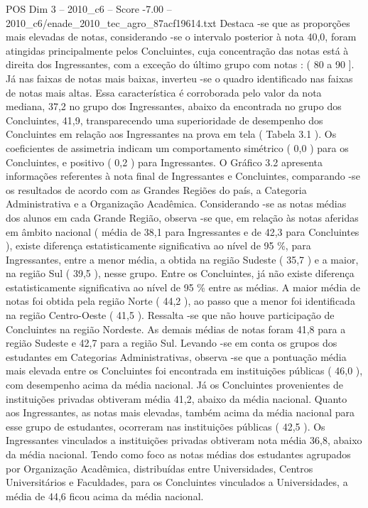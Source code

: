 \begin{textsample}{POS Dim 3 – 2010\_c6 – Score -7.00 – 2010\_c6/enade\_2010\_tec\_agro\_87acf19614.txt}
Destaca -se que as proporções mais elevadas de notas, considerando -se o intervalo posterior à nota 40,0, foram atingidas principalmente pelos Concluintes, cuja concentração das notas está à direita dos Ingressantes, com a exceção do último grupo com notas : ( 80 a 90 ].
Já nas faixas de notas mais baixas, inverteu -se o quadro identificado nas faixas de notas mais altas.
Essa característica é corroborada pelo valor da nota mediana, 37,2 no grupo dos Ingressantes, abaixo da encontrada no grupo dos Concluintes, 41,9, transparecendo uma superioridade de desempenho dos Concluintes em relação aos Ingressantes na prova em tela ( Tabela 3.1 ).
Os coeficientes de assimetria indicam um comportamento simétrico ( 0,0 ) para os Concluintes, e positivo ( 0,2 ) para Ingressantes.
O Gráfico 3.2 apresenta informações referentes à nota final de Ingressantes e Concluintes, comparando -se os resultados de acordo com as Grandes Regiões do país, a Categoria Administrativa e a Organização Acadêmica.
Considerando -se as notas médias dos alunos em cada Grande Região, observa -se que, em relação às notas aferidas em âmbito nacional ( média de 38,1 para Ingressantes e de 42,3 para Concluintes ), existe diferença estatisticamente significativa ao nível de 95 \%, para Ingressantes, entre a menor média, a obtida na região Sudeste ( 35,7 ) e a maior, na região Sul ( 39,5 ), nesse grupo.
Entre os Concluintes, já não existe diferença estatisticamente significativa ao nível de 95 \% entre as médias.
A maior média de notas foi obtida pela região Norte ( 44,2 ), ao passo que a menor foi identificada na região Centro-Oeste ( 41,5 ).
Ressalta -se que não houve participação de Concluintes na região Nordeste.
As demais médias de notas foram 41,8 para a região Sudeste e 42,7 para a região Sul.
Levando -se em conta os grupos dos estudantes em Categorias Administrativas, observa -se que a pontuação média mais elevada entre os Concluintes foi encontrada em instituições públicas ( 46,0 ), com desempenho acima da média nacional.
Já os Concluintes provenientes de instituições privadas obtiveram média 41,2, abaixo da média nacional.
Quanto aos Ingressantes, as notas mais elevadas, também acima da média nacional para esse grupo de estudantes, ocorreram nas instituições públicas ( 42,5 ).
Os Ingressantes vinculados a instituições privadas obtiveram nota média 36,8, abaixo da média nacional.
Tendo como foco as notas médias dos estudantes agrupados por Organização Acadêmica, distribuídas entre Universidades, Centros Universitários e Faculdades, para os Concluintes vinculados a Universidades, a média de 44,6 ficou acima da média nacional.

\end{textsample}
